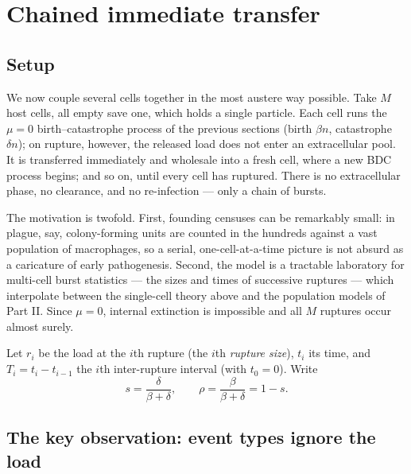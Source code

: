 
\section{Chained immediate transfer}
\label{sec:chained}

\subsection{Setup}

We now couple several cells together in the most austere way possible. Take
$M$ host cells, all empty save one, which holds a single particle. Each cell
runs the $\mu=0$ birth--catastrophe process of the previous sections (birth
$\beta n$, catastrophe $\delta n$); on rupture, however, the released load
does not enter an extracellular pool. It is transferred immediately and
wholesale into a fresh cell, where a new BDC process begins; and so on,
until every cell has ruptured. There is no extracellular phase, no
clearance, and no re-infection --- only a chain of bursts.

The motivation is twofold. First, founding censuses can be remarkably small:
in plague, say, colony-forming units are counted in the hundreds against a
vast population of macrophages, so a serial, one-cell-at-a-time picture is
not absurd as a caricature of early pathogenesis. Second, the model is a
tractable laboratory for multi-cell burst statistics --- the sizes and times
of successive ruptures --- which interpolate between the single-cell theory
above and the population models of Part II. Since $\mu=0$, internal
extinction is impossible and all $M$ ruptures occur almost surely.

Let $r_i$ be the load at the $i$th rupture (the $i$th \emph{rupture size}),
$t_i$ its time, and $T_i=t_i-t_{i-1}$ the $i$th inter-rupture interval
(with $t_0=0$). Write
\begin{equation}
s=\frac{\delta}{\beta+\delta},
\qquad
\rho=\frac{\beta}{\beta+\delta}=1-s.
\end{equation}

\subsection{The key observation: event types ignore the load}
\label{sec:key-observation}

